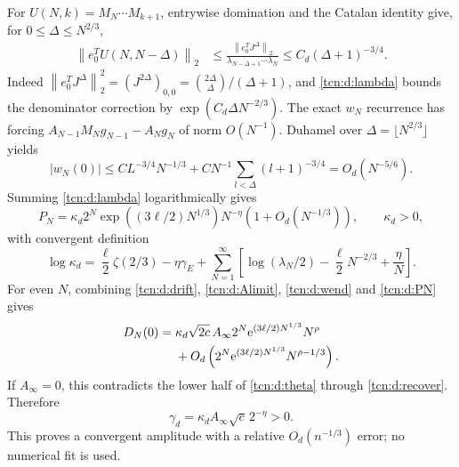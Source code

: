 \documentclass[11pt,letterpaper]{article}
\newcommand{\norm}[1]{\left\lVert#1\right\rVert}
\newcommand{\ee}{\mathrm e}
\theoremstyle{remark}
\begin{document}
For $U(N,k)=M_N\cdots M_{k+1}$, entrywise domination and the Catalan identity give, for $0\le \Delta\le N^{2/3}$,
\begin{align}
 \norm{e_0^TU(N,N-\Delta)}_2
 &\le\frac{\norm{e_0^TJ^\Delta}_2}{\lambda_{N-\Delta+1}\cdots\lambda_N}
 \le C_d(\Delta+1)^{-3/4}.\label{tcn:d:smoothing}
\end{align}
Indeed $\norm{e_0^TJ^\Delta}_2^2=(J^{2\Delta})_{0,0}=\binom{2\Delta}\Delta/(\Delta+1)$, and \eqref{tcn:d:lambda} bounds the denominator correction by $\exp(C_d\Delta N^{-2/3})$. The exact $w_N$ recurrence has forcing $A_{N-1}M_Ng_{N-1}-A_Ng_N$ of norm $O(N^{-1})$. Duhamel over $\Delta=\lfloor N^{2/3}\rfloor$ yields
\begin{equation}\label{tcn:d:wend}
 |w_N(0)|\le CL^{-3/4}N^{-1/3}
       +CN^{-1}\sum_{l<\Delta}(l+1)^{-3/4}=O_d(N^{-5/6}).
\end{equation}
Summing \eqref{tcn:d:lambda} logarithmically gives
\begin{equation}\label{tcn:d:PN}
 P_N=\kappa_d2^N\exp((3\ell/2)N^{1/3})N^{-\eta}
        (1+O_d(N^{-1/3})),\qquad\kappa_d>0,
\end{equation}
with convergent definition
\begin{equation}\label{tcn:d:kappa}
 \log\kappa_d=\frac\ell2\zeta(2/3)-\eta\gamma_E
 +\sum_{N=1}^\infty\left[\log(\lambda_N/2)-\frac\ell2N^{-2/3}+\frac\eta N\right].
\end{equation}
For even $N$, combining \eqref{tcn:d:drift}, \eqref{tcn:d:Alimit}, \eqref{tcn:d:wend} and \eqref{tcn:d:PN} gives
\begin{align}\label{tcn:d:endpoint}
 D_N(0)={}&\kappa_d\sqrt{2c}\,A_\infty
       2^N\ee^{(3\ell/2)N^{1/3}}N^\rho\notag\\
 &+O_d\left(2^N\ee^{(3\ell/2)N^{1/3}}N^{\rho-1/3}\right).
\end{align}
If $A_\infty=0$, this contradicts the lower half of \eqref{tcn:d:theta} through \eqref{tcn:d:recover}. Therefore
\begin{equation}\label{tcn:d:gamma}
 \gamma_d=\kappa_dA_\infty\sqrt c\,2^{-\eta}>0.
\end{equation}
This proves a convergent amplitude with a relative $O_d(n^{-1/3})$ error; no numerical fit is used.
\end{document}
